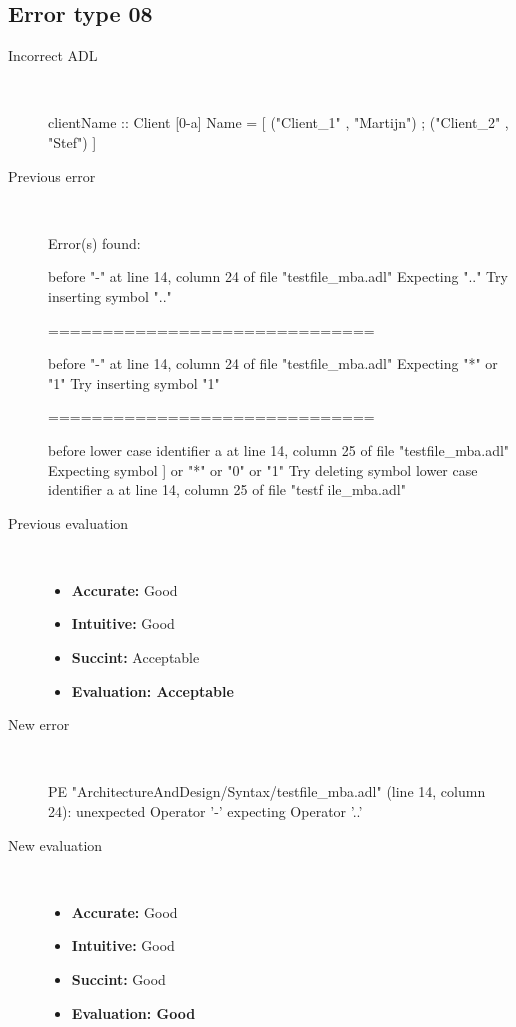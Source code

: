 \hrulefill

\subsection{Error type 08}
  \begin{description}
  \item[Incorrect ADL]~\\
\begin{adl}
clientName :: Client [0-a] Name =
    [ ("Client_1"      , "Martijn")
    ; ("Client_2"      , "Stef")
    ]\end{adl}
  \item[Previous error]~\\
\begin{haskell}
Error(s) found:

before "-" at line 14, column 24 of file "testfile_mba.adl"
Expecting ".."
Try inserting symbol ".."

==============================

before "-" at line 14, column 24 of file "testfile_mba.adl"
Expecting "*" or "1"
Try inserting symbol "1"

==============================

before lower case identifier a at line 14, column 25 of file "testfile_mba.adl"
Expecting symbol ] or "*" or "0" or "1"
Try deleting symbol lower case identifier a at line 14, column 25 of file "testf
ile_mba.adl"\end{haskell}
  \item[Previous evaluation]~\\
    \begin{itemize}
    \item \textbf{Accurate:} Good
    \item \textbf{Intuitive:} Good
    \item \textbf{Succint:} Acceptable
    \item \textbf{Evaluation: Acceptable}
    \end{itemize}
  \item[New error]~\\
\begin{haskell}
PE "ArchitectureAndDesign/Syntax/testfile_mba.adl" (line 14, column 24):
unexpected Operator '-'
expecting Operator '..'
\end{haskell}
  \item[New evaluation]~\\
    \begin{itemize}
    \item \textbf{Accurate:} Good
    \item \textbf{Intuitive:} Good
    \item \textbf{Succint:} Good
    \item \textbf{Evaluation: Good
}
    \end{itemize}
  \end{description}

